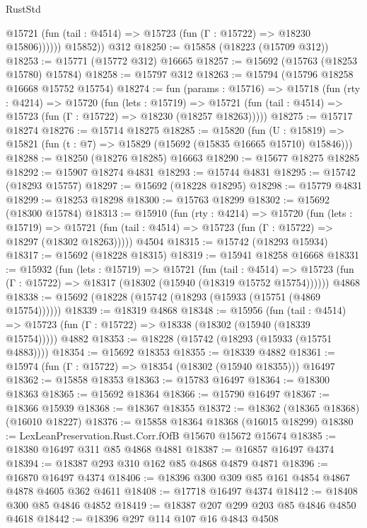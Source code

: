 \begin{lexlean}{RustStd}
\begin{coremodule}
              @15721 (fun (tail : @4514) => @15723 (fun (Γ : @15722) => @18230 @15806))))))
        @15852))
    @312
@18250 := @15858 (@18223 (@15709 @312))
@18253 := @15771 (@15772 @312) @16665
@18257 := @15692 (@15763 (@18253 @15780) @15784)
@18258 := @15797 @312
@18263 := @15794 (@15796 @18258 @16668 @15752 @15754)
@18274 := fun (params : @15716) =>
  @15718
    (fun (rty : @4214) =>
    @15720
      (fun (lets : @15719) =>
      @15721 (fun (tail : @4514) => @15723 (fun (Γ : @15722) => @18230 (@18257 @18263)))))
@18275 := @15717 @18274
@18276 := @15714 @18275
@18285 := @15820
    (fun (U : @15819) => @15821 (fun (t : @7) => @15829 (@15692 (@15835 @16665 @15710) @15846)))
@18288 := @18250 (@18276 @18285) @16663
@18290 := @15677 @18275 @18285
@18292 := @15907 @18274 @4831
@18293 := @15744 @4831
@18295 := @15742 (@18293 @15757)
@18297 := @15692 (@18228 @18295)
@18298 := @15779 @4831
@18299 := @18253 @18298
@18300 := @15763 @18299
@18302 := @15692 (@18300 @15784)
@18313 := @15910
    (fun (rty : @4214) =>
    @15720
      (fun (lets : @15719) =>
      @15721 (fun (tail : @4514) => @15723 (fun (Γ : @15722) => @18297 (@18302 @18263)))))
    @4504
@18315 := @15742 (@18293 @15934)
@18317 := @15692 (@18228 @18315)
@18319 := @15941 @18258 @16668
@18331 := @15932
    (fun (lets : @15719) =>
    @15721
      (fun (tail : @4514) =>
      @15723 (fun (Γ : @15722) => @18317 (@18302 (@15940 (@18319 @15752 @15754))))))
    @4868
@18338 := @15692 (@18228 (@15742 (@18293 (@15933 (@15751 (@4869 @15754))))))
@18339 := @18319 @4868
@18348 := @15956
    (fun (tail : @4514) => @15723 (fun (Γ : @15722) => @18338 (@18302 (@15940 (@18339 @15754)))))
    @4882
@18353 := @18228 (@15742 (@18293 (@15933 (@15751 @4883))))
@18354 := @15692 @18353
@18355 := @18339 @4882
@18361 := @15974 (fun (Γ : @15722) => @18354 (@18302 (@15940 @18355))) @16497
@18362 := @15858 @18353
@18363 := @15783 @16497
@18364 := @18300 @18363
@18365 := @15692 @18364
@18366 := @15790 @16497
@18367 := @18366 @15939
@18368 := @18367 @18355
@18372 := @18362 (@18365 @18368) (@16010 @18227)
@18376 := @15858 @18364 @18368 (@16015 @18299)
@18380 := LexLeanPreservation.Rust.Corr.fOfB @15670 @15672 @15674
@18385 := @18380 @16497 @311 @85 @4868 @4881
@18387 := @16857 @16497 @4374
@18394 := @18387 @293 @310 @162 @85 @4868 @4879 @4871
@18396 := @16870 @16497 @4374
@18406 := @18396 @300 @309 @85 @161 @4854 @4867 @4878 @4605 @362 @4611
@18408 := @17718 @16497 @4374
@18412 := @18408 @300 @85 @4846 @4852
@18419 := @18387 @207 @299 @203 @85 @4846 @4850 @4618
@18442 := @18396
    @297
    @114
    @107
    @16
    @4843
    @4508

\end{coremodule}
\end{lexlean}
